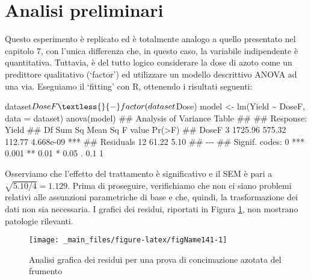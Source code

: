 \documentclass[a4paper,12pt,oneside]{book}
\newenvironment{Shaded}{\begin{snugshade}}{\end{snugshade}}
\newcommand{\SpecialCharTok}[1]{#1}
\newcommand{\DocumentationTok}[1]{#1}
\newcommand{\OtherTok}[1]{#1}
\newcommand{\FunctionTok}[1]{#1}
\newcommand{\AttributeTok}[1]{#1}
\newcommand{\NormalTok}[1]{#1}
\begin{document}
\hypertarget{analisi-preliminari}{%
\section{Analisi preliminari}\label{analisi-preliminari}}

Questo esperimento è replicato ed è totalmente analogo a quello presentato nel capitolo 7, con l'unica differenza che, in questo caso, la variabile indipendente è quantitativa. Tuttavia, è del tutto logico considerare la dose di azoto come un predittore qualitativo (`factor') ed utilizzare un modello descrittivo ANOVA ad una via. Eseguiamo il `fitting' con R, ottenendo i risultati seguenti:

\begin{Shaded}
\begin{Highlighting}[]
\NormalTok{dataset}\SpecialCharTok{$}\NormalTok{DoseF }\OtherTok{\textless{}{-}} \FunctionTok{factor}\NormalTok{(dataset}\SpecialCharTok{$}\NormalTok{Dose)}
\NormalTok{model }\OtherTok{\textless{}{-}} \FunctionTok{lm}\NormalTok{(Yield }\SpecialCharTok{\textasciitilde{}}\NormalTok{ DoseF, }\AttributeTok{data =}\NormalTok{ dataset)}
\FunctionTok{anova}\NormalTok{(model)}
\DocumentationTok{\#\# Analysis of Variance Table}
\DocumentationTok{\#\# }
\DocumentationTok{\#\# Response: Yield}
\DocumentationTok{\#\#           Df  Sum Sq Mean Sq F value    Pr(\textgreater{}F)    }
\DocumentationTok{\#\# DoseF      3 1725.96  575.32  112.77 4.668e{-}09 ***}
\DocumentationTok{\#\# Residuals 12   61.22    5.10                      }
\DocumentationTok{\#\# {-}{-}{-}}
\DocumentationTok{\#\# Signif. codes:  0 \textquotesingle{}***\textquotesingle{} 0.001 \textquotesingle{}**\textquotesingle{} 0.01 \textquotesingle{}*\textquotesingle{} 0.05 \textquotesingle{}.\textquotesingle{} 0.1 \textquotesingle{} \textquotesingle{} 1}
\end{Highlighting}
\end{Shaded}

Osserviamo che l'effetto del trattamento è significativo e il SEM è pari a \(\sqrt{5.10/4} = 1.129\). Prima di proseguire, verifichiamo che non ci siano problemi relativi alle assunzioni parametriche di base e che, quindi, la trasformazione dei dati non sia necessaria. I grafici dei residui, riportati in Figura \ref{fig:figName141}, non mostrano patologie rilevanti.

\begin{figure}

{\centering \texttt{[image: \_main\_files/figure-latex/figName141-1]} 

}

\caption{Analisi grafica dei residui per una prova di concimazione azotata del frumento}\label{fig:figName141}
\end{figure}
\end{document}
